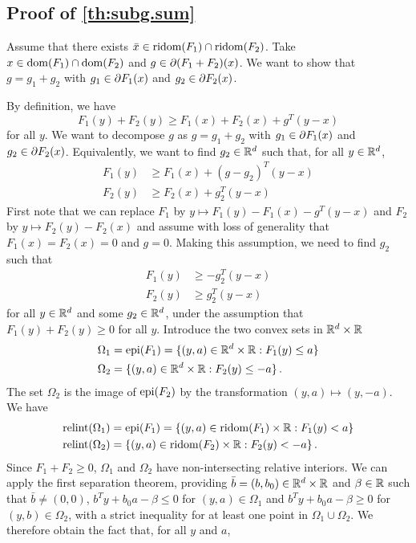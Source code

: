\subsection{Proof of \cref{th:subg.sum}}
Assume that there exists $\bar x\in \mathrm{ridom}(F_1) \cap \mathrm{ridom}(F_2)$. Take $x\in \mathrm{dom}(F_1) \cap \mathrm{dom}(F_2)$ and $g \in \partial (F_1+F_2)(x)$. We want to show that $g = g_1 + g_2$ with $g_1\in \partial F_1(x)$ and $g_2\in \partial F_2(x)$. 

By definition, we have
\[
F_1(y) + F_2(y) \geq F_1(x) + F_2(x) + g^T(y-x)
\]
for all $y$. 
We want to decompose $g$ as $g = g_1 + g_2$ with $g_1\in \partial F_1(x)$ and $g_2\in \partial F_2(x)$. Equivalently, we want to find $g_2\in {\mathbb{R}}^d$ such that, for all $y\in {\mathbb{R}}^d$,
\begin{align*}
F_1(y)& \geq F_1(x) + (g-g_2)^T(y-x)\\
F_2(y)& \geq F_2(x) + g_2^T(y-x)
\end{align*}
First note that we can replace $F_1$ by $y \mapsto F_1(y) - F_1(x) - g^T (y-x)$ and $F_2$ by $y\mapsto F_2(y) - F_2(x)$ and assume with loss of generality that $F_1(x) = F_2(x) = 0$ and $g=0$. Making this assumption, we need to find $g_2$ such that
\begin{align*}
F_1(y)& \geq -g_2^T(y-x)\\
F_2(y)& \geq  g_2^T(y-x)
\end{align*}
for all $y\in{\mathbb{R}}^d$ and some $g_2\in {\mathbb{R}}^d$, under the assumption that $F_1(y) + F_2(y)\geq 0$ for all $y$.
Introduce the two convex sets in ${\mathbb{R}}^d\times {\mathbb{R}}$
\begin{align*}
\Omega_1 & =\mathrm{epi}(F_1) = \{(y, a) \in {\mathbb{R}}^d\times {\mathbb{R}}: F_1(y)  \leq a\}
\\
\Omega_2 &= \{(y, a) \in {\mathbb{R}}^d\times {\mathbb{R}}:  F_2(y) \leq -a\}\,.
\end{align*}
The set $\Omega_2$ is the image of $\mathrm{epi}(F_2)$ by the transformation $(y,a) \mapsto (y, -a)$. 
We have
\begin{align*}
\mathrm{relint}(\Omega_1) & =\mathrm{epi}(F_1) = \{(y, a) \in \mathrm{ridom}(F_1) \times {\mathbb{R}}: F_1(y)  < a\}
\\
\mathrm{relint}(\Omega_2) &= \{(y, a) \in \mathrm{ridom}(F_2) \times {\mathbb{R}}:  F_2(y) < -a\}\,.
\end{align*}
Since $F_1+F_2 \geq 0$, $\Omega_1$ and $\Omega_2$ have non-intersecting relative interiors. 
We can apply the first separation theorem, providing  $\bar b = (b, b_0) \in {\mathbb{R}}^d \times {\mathbb{R}}$ and $\beta\in {\mathbb{R}}$ such that $\bar b \neq (0,0)$, 
$b^Ty + b_0a - \beta \leq 0$ for $(y, a)\in \Omega_1$ and $b^Ty + b_0a - \beta \geq 0$ for $(y,b) \in \Omega_2$, with a strict inequality for at least one point in $\Omega_1\cup \Omega_2$. We therefore obtain the fact that, for all $y$ and $a$,
